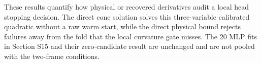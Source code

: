These results quantify how physical or recovered derivatives audit a local head stopping decision. The direct cone solution solves this three-variable calibrated quadratic without a raw warm start, while the direct physical bound rejects failures away from the fold that the local curvature gate misses. The 20 MLP fits in Section S15 and their zero-candidate result are unchanged and are not pooled with the two-frame conditions.








